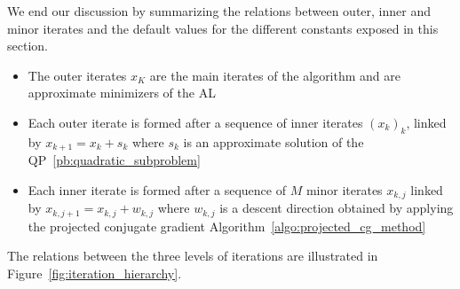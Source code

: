 We end our discussion by summarizing the relations between outer, inner and minor iterates and the default values for the different constants exposed in this section.
\begin{itemize}
	\item The outer iterates $x_K$ are the main iterates of the algorithm and are approximate minimizers of the AL
	\item Each outer iterate is formed after a sequence of inner iterates $(x_k)_k$, linked by $x_{k+1}=x_k+s_k$ where $s_k$ is an approximate solution of the QP~\eqref{pb:quadratic_subproblem}
	\item Each inner iterate is formed after a sequence of $M$ minor iterates $x_{k,j}$ linked by $x_{k,j+1}=x_{k,j}+w_{k,j}$ where $w_{k,j}$ is a descent direction obtained by applying the projected conjugate gradient Algorithm~\ref{algo:projected_cg_method}
\end{itemize} 
The relations between the three levels of iterations are illustrated in Figure~\ref{fig:iteration_hierarchy}.

